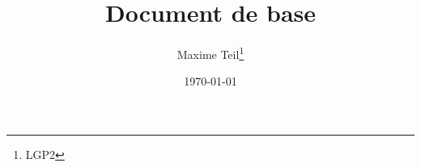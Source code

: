 \documentclass[a4paper, 11pt]{article} %
\title{Document de base}
\author{Maxime Teil\thanks{LGP2}}
\date{\today}
\begin{document}
	
	
	\blinddocument
	
%	
%	
%	
	
\end{document}
